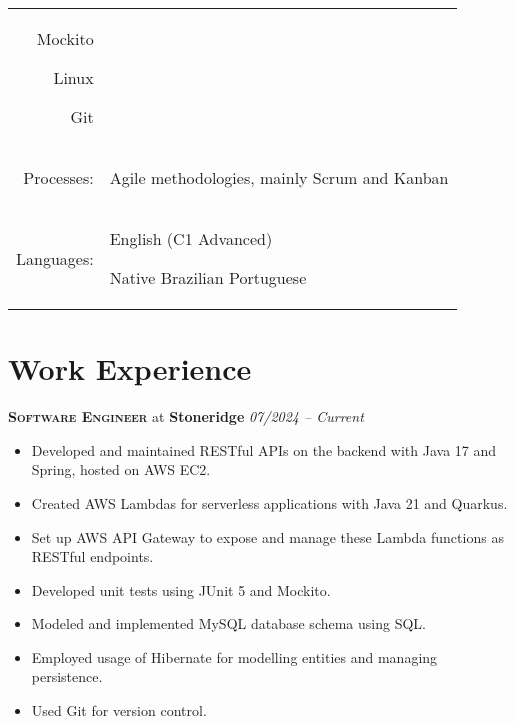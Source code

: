 \documentclass[a4paper,12pt]{article}
\begin{document}
\begin{tabular}{rp{15.2cm}}
\begin{itemize*}[label=\Large\textbullet]
    \item Mockito
    \item Linux
    \item Git
\end{itemize*}\\
\raggedleft Processes:
& \begin{itemize*}[label=\Large\textbullet]
    \item Agile methodologies, mainly Scrum and Kanban
\end{itemize*}\\
\raggedleft Languages:
& \begin{itemize*}[label=\Large\textbullet]
    \item English (C1 Advanced)
    \item Native Brazilian Portuguese
\end{itemize*}\\
\end{tabular}

\section{Work Experience}

\vspace{8pt}

\textbf{\textsc{Software Engineer}} at \textbf{Stoneridge} \hfill \textit{07/2024 -- Current}

{\small
\begin{itemize}[leftmargin=*,label=\large\textbullet]
    \setlength\itemsep{-0.2em}
    \item Developed and maintained RESTful APIs on the backend with Java 17 and Spring, hosted on AWS EC2.
    \item Created AWS Lambdas for serverless applications with Java 21 and Quarkus.
    \item Set up AWS API Gateway to expose and manage these Lambda functions as RESTful endpoints.
    \item Developed unit tests using JUnit 5 and Mockito.
    \item Modeled and implemented MySQL database schema using SQL.
    \item Employed usage of Hibernate for modelling entities and managing persistence.
    \item Used Git for version control.
\end{itemize}
}
\end{document}
